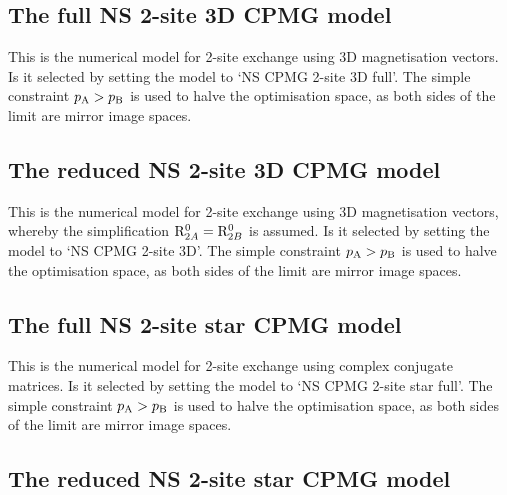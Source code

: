 \subsection{The full NS 2-site 3D CPMG model}
\label{sect: dispersion: NS CPMG 2-site 3D full model}

This is the numerical model for 2-site exchange using 3D magnetisation vectors.
Is it selected by setting the model to `NS CPMG 2-site 3D full'.
The simple constraint $p_\textrm{A} > p_\textrm{B}$ is used to halve the optimisation space, as both sides of the limit are mirror image spaces.



\subsection{The reduced NS 2-site 3D CPMG model}
\label{sect: dispersion: NS CPMG 2-site 3D model}

This is the numerical model for 2-site exchange using 3D magnetisation vectors, whereby the simplification $\mathrm{R}_{2A}^0 = \mathrm{R}_{2B}^0$ is assumed.
Is it selected by setting the model to `NS CPMG 2-site 3D'.
The simple constraint $p_\textrm{A} > p_\textrm{B}$ is used to halve the optimisation space, as both sides of the limit are mirror image spaces.



\subsection{The full NS 2-site star CPMG model}
\label{sect: dispersion: NS CPMG 2-site star full model}

This is the numerical model for 2-site exchange using complex conjugate matrices.
Is it selected by setting the model to `NS CPMG 2-site star full'.
The simple constraint $p_\textrm{A} > p_\textrm{B}$ is used to halve the optimisation space, as both sides of the limit are mirror image spaces.



\subsection{The reduced NS 2-site star CPMG model}
\label{sect: dispersion: NS CPMG 2-site star model}

